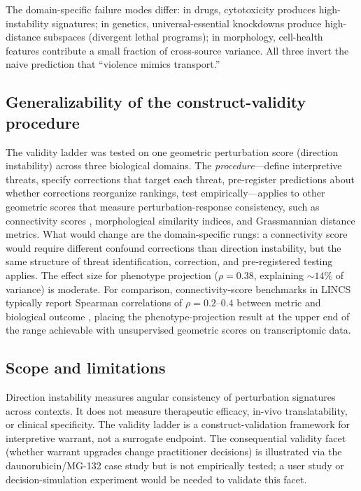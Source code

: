\documentclass[11pt]{article}
\begin{document}
The domain-specific failure modes differ: in drugs, cytotoxicity
produces high-instability signatures; in genetics, universal-essential
knockdowns produce high-distance subspaces (divergent lethal programs);
in morphology, cell-health features contribute a small fraction of
cross-source variance. All three invert the naive prediction that
``violence mimics transport.''

\subsection{Generalizability of the construct-validity procedure}

The validity ladder was tested on one geometric perturbation score
(direction instability) across three biological domains. The
\emph{procedure}---define interpretive threats, specify corrections
that target each threat, pre-register predictions about whether
corrections reorganize rankings, test empirically---applies to other
geometric scores that measure perturbation-response consistency, such as
connectivity scores \citep{subramanian2017next}, morphological similarity
indices, and Grassmannian distance metrics. What would change are the
domain-specific rungs: a connectivity score would require different
confound corrections than direction instability, but the same
structure of threat identification, correction, and pre-registered
testing applies. The effect size for phenotype projection ($\rho = 0.38$,
explaining ${\sim}14\%$ of variance) is moderate. For comparison,
connectivity-score benchmarks in LINCS typically report Spearman
correlations of $\rho = 0.2$--$0.4$ between metric and biological
outcome \citep{li2020comprehensive}, placing the phenotype-projection
result at the upper end of the range achievable with unsupervised
geometric scores on transcriptomic data.

\subsection{Scope and limitations}

Direction instability measures angular consistency of perturbation signatures
across contexts. It does not measure therapeutic efficacy, in-vivo
translatability, or clinical specificity. The validity ladder is a
construct-validation framework for interpretive warrant, not a surrogate
endpoint. The consequential validity facet (whether warrant upgrades
change practitioner decisions) is illustrated via the daunorubicin/MG-132
case study but is not empirically tested; a user study or
decision-simulation experiment would be needed to validate this facet.
\end{document}
